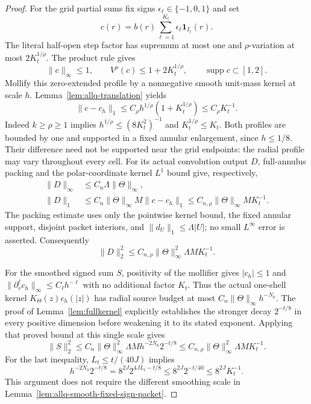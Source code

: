 \documentclass[11pt]{article}
\numberwithin{equation}{section}
\theoremstyle{remark}
\theoremstyle{definition}
\newcommand{\supp}{\operatorname{supp}}
\begin{document}
\begin{proof}
For the grid partial sums fix signs
$\epsilon_\ell\in\{-1,0,1\}$ and set
\[
 c(r)=b(r)\sum_{\ell=1}^{K_t}\epsilon_\ell\mathbf1_{I_\ell}(r).
\]
The literal half-open step factor has supremum at most one and
$\rho$-variation at most $2K_t^{1/\rho}$.  The product rule gives
\begin{equation}\label{eq:allq-signed-profile}
 \|c\|_\infty\le1,
 \qquad V^\rho(c)\le1+2K_t^{1/\rho},
 \qquad \supp c\subset[1,2].
\end{equation}
Mollify this zero-extended profile by a nonnegative smooth unit-mass
kernel at scale $h$.  Lemma~\ref{lem:allq-translation} yields
\begin{equation}\label{eq:allq-terminal-smooth-error-L1}
 \|c-c_h\|_1
 \le C_\rho h^{1/\rho}(1+K_t^{1/\rho})
 \le C_\rho K_t^{-1}.
\end{equation}
Indeed $k\ge\rho\ge1$ implies
$h^{1/\rho}\le(8K_t^2)^{-1}$ and $K_t^{1/\rho}\le K_t$.
Both profiles are bounded by one and supported in a fixed annular
enlargement, since $h\le1/8$.  Their difference need not be supported
near the grid endpoints: the radial profile may vary throughout every
cell.  For its actual convolution output $D$, full-annulus packing
and the polar-coordinate kernel $L^1$ bound give, respectively,
\begin{align}
 \|D\|_\infty
 &\le C_n\Lambda\|\Theta\|_\infty,
 \label{eq:allq-terminal-unsmooth-Linf}\\
 \|D\|_1
 &\le C_n\|\Theta\|_\infty M\|c-c_h\|_1
 \le C_{n,\rho}\|\Theta\|_\infty M K_t^{-1}.
 \label{eq:allq-terminal-unsmooth-L1}
\end{align}
The packing estimate uses only the pointwise kernel bound, the fixed
annular support, disjoint packet interiors, and
$\|d_U\|_1\le\Lambda|U|$; no small $L^\infty$ error is asserted.
Consequently
\begin{equation}\label{eq:allq-terminal-unsmooth-L2}
 \|D\|_2^2
 \le C_{n,\rho}\|\Theta\|_\infty^2\Lambda M K_t^{-1}.
\end{equation}

For the smoothed signed sum $S$, positivity of the mollifier gives
$|c_h|\le1$ and
$\|\partial_r^\ell c_h\|_\infty\le C_\ell h^{-\ell}$ with no
additional factor $K_t$.  Thus the actual one-shell kernel
$K_\Theta(z)c_h(|z|)$ has radial source budget at most
$C_n\|\Theta\|_\infty h^{-N_0}$.  The proof of
Lemma~\ref{lem:fullkernel} explicitly establishes the stronger decay
$2^{-t/8}$ in every positive dimension before weakening it to its
stated exponent.  Applying that proved bound at this single scale gives
\begin{equation}\label{eq:allq-terminal-smoothed-L2}
 \|S\|_2^2
 \le C_n\|\Theta\|_\infty^2\Lambda M h^{-2N_0}2^{-t/8}
 \le C_{n,\rho}\|\Theta\|_\infty^2\Lambda M K_t^{-1}.
\end{equation}
For the last inequality, $L_t\le t/(40J)$ implies
\[
 h^{-2N_0}2^{-t/8}
 =8^{2J}2^{4JL_t-t/8}
 \le8^{2J}2^{-t/40}\le8^{2J}K_t^{-1}.
\]
This argument does not require the different smoothing scale in
Lemma~\ref{lem:allq-smooth-fixed-sign-packet}.


\end{proof}
\end{document}
